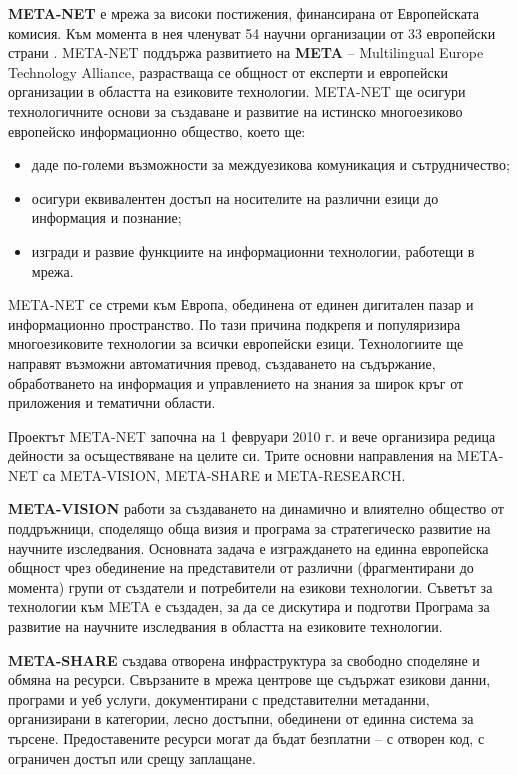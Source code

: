   \begin{multicols}{2}

    \textbf{META-NET} е мрежа за високи постижения, финансирана от Европейската
    комисия. Към момента в нея членуват 54 научни организации от 33 европейски страни \cite{rehm2011}. META-NET поддържа развитието
    на \textbf{META} -- Multilingual Europe Technology Alliance, разрастваща се общност от експерти и
    европейски организации в областта на езиковите
    технологии. META-NET ще осигури  технологичните основи за създаване и развитие на истинско многоезиково европейско информационно общество, което ще:

  \begin{itemize}
  \item даде по-големи възможности за междуезикова комуникация и сътрудничество;
  \item осигури еквивалентен достъп на носителите на различни езици до информация и познание;
  \item изгради и развие функциите на информационни технологии, работещи в мрежа.
  \end{itemize}

META-NET  се стреми към Европа, обединена от единен дигитален пазар и информационно пространство. По тази причина подкрепя и популяризира многоезиковите технологии за всички
  европейски езици. Технологиите ще направят възможни автоматичния
  превод, създаването на съдържание, обработването на информация и
  управлението на знания за широк кръг от приложения и тематични
  области. 

  Проектът META-NET започна на 1 февруари 2010 г.  и вече организира редица дейности  за осъществяване на целите си. Трите основни направления на META-NET
  са META-VISION, META-SHARE и META-RESEARCH.

  \textbf{META-VISION} работи за създаването на динамично и влиятелно
  общество от поддръжници, споделящо обща визия и програма за
  стратегическо развитие на научните изследвания. Основната задача е
  изграждането на единна европейска общност чрез обединение на
  представители от различни (фрагментирани до момента) групи от
  създатели и потребители на езикови технологии. Съветът за технологии към META е създаден, за да се дискутира и подготви Програма за развитие на научните изследвания в областта на езиковите технологии.

  \textbf{META-SHARE} създава отворена инфраструктура за свободно
  споделяне и обмяна на ресурси. Свързаните в мрежа центрове ще съдържат
  езикови данни, програми и уеб услуги, документирани с представителни
  метаданни, организирани в категории, лесно достъпни, обединени от
  единна система за търсене.  Предоставените ресурси могат да бъдат
  безплатни -- с отворен код, с ограничен достъп или срещу
  заплащане. 


\end{multicols}
